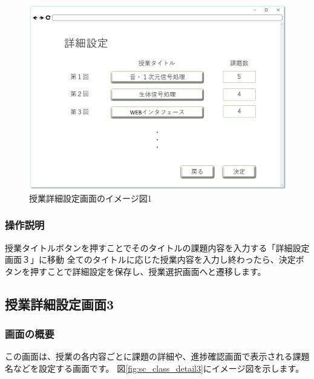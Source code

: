 \begin{figure}[htbp]
\begin{center}
  \includegraphics[width=1\linewidth,clip]{./img/sc_class_detail2.png}
  \caption{授業詳細設定画面のイメージ図1}\label{fig:sc_class_detail2}
\end{center}
\end{figure}

\subsubsection{操作説明}
授業タイトルボタンを押すことでそのタイトルの課題内容を入力する「詳細設定画面３」に移動
全てのタイトルに応じた授業内容を入力し終わったら、決定ボタンを押すことで詳細設定を保存し、授業選択画面へと遷移します。

\newpage

\subsection{授業詳細設定画面3}
\subsubsection{画面の概要}
この画面は、授業の各内容ごとに課題の詳細や、進捗確認画面で表示される課題名などを設定する画面です。
図\ref{fig:sc_class_detail3}にイメージ図を示します。

